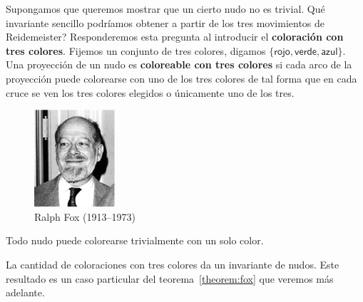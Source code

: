 \documentclass[graybox]{svmult}
\begin{document}
 \label{block:3coloring}
 Supongamos que queremos mostrar que un cierto nudo no es trivial. \textquestiondown Qué
 invariante sencillo podríamos obtener a partir de los tres movimientos de
 Reidemeister? Responderemos esta pregunta al introducir el \textbf{coloración 
 con tres colores}. Fijemos un conjunto de tres colores,
 digamos $\{\textsf{rojo},\textsf{verde},\textsf{azul}\}$.  Una proyección
 de un nudo es \textbf{coloreable con tres colores} si cada arco de la
 proyección puede colorearse con uno de los tres colores de tal forma que en
 cada cruce se ven los tres colores elegidos o únicamente uno de los tres. 

\begin{figure}[ht]
	\centering
    \includegraphics[width=30mm,height=36mm]{images/fox}
    \caption{Ralph Fox (1913--1973)}
\end{figure}



Todo nudo puede colorearse trivialmente con un solo color. 

La cantidad de coloraciones con tres colores da un invariante de nudos. Este
resultado es un caso particular del teorema~\ref{theorem:fox} que veremos más
adelante. 
\end{document}
